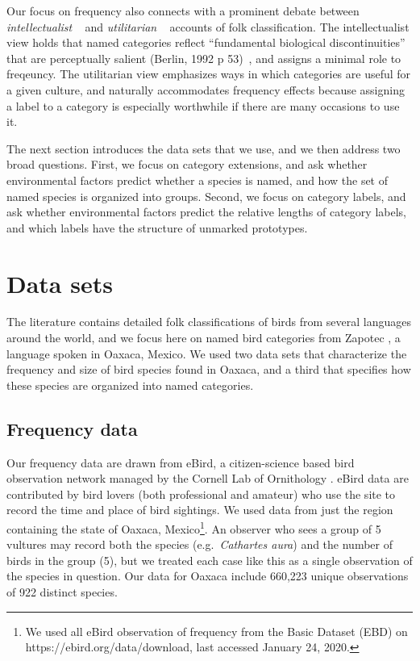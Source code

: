 \documentclass[10pt,letterpaper]{article}
\begin{document}
Our focus on frequency also connects with a prominent debate between \emph{intellectualist} ~\cite{berlin2014ethnobiological} and \emph{utilitarian} ~\cite{hunn1982utilitarian} accounts of folk classification. The intellectualist view holds that named categories reflect ``fundamental biological discontinuities'' that are perceptually salient (Berlin, 1992 p 53)~\nocite{berlin2014ethnobiological}, and assigns a minimal role to freqeuncy. The utilitarian view emphasizes ways in which categories are useful for a given culture, and naturally accommodates frequency effects because assigning a label to a category is especially worthwhile if there are many occasions to use it.

The next section introduces the data sets that we use, and we then address two broad questions. First, we focus on category extensions, and ask whether environmental factors predict whether a species is named, and how the set of named species is organized into groups. Second, we focus on category labels, and ask whether environmental factors predict the relative lengths of category labels, and which labels have the structure of unmarked prototypes. 


\section{Data sets}

The literature contains detailed folk classifications of birds from several languages around the world, and we focus here on named bird categories from Zapotec \cite{hunn2008zapotec}, a language spoken in Oaxaca, Mexico.  We used two data sets that characterize the frequency and size of bird species found in Oaxaca, and a third that specifies how these species are organized into named categories.

\subsection{Frequency data}

Our frequency data are drawn from eBird, a citizen-science based bird observation network managed by the Cornell Lab of Ornithology \cite{sullivan2009ebird}.  eBird data are contributed by bird lovers (both professional and amateur) who use the site to record the time and place of bird sightings.  We used data from just the region containing the state of Oaxaca, Mexico\footnote{We used all eBird observation of frequency from the Basic Dataset (EBD) on https://ebird.org/data/download, last accessed January 24, 2020.}. An observer who sees a group of 5 vultures may record both the species (e.g.\ \emph{Cathartes aura}) and the number of birds in the group (5), but we treated each case like this as a single observation of the species in question. Our data for Oaxaca include 660,223 unique observations of 922 distinct species. 
\end{document}
